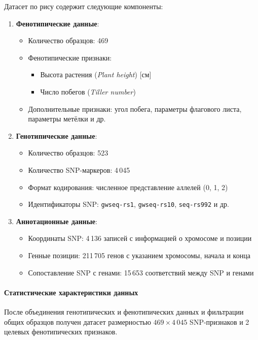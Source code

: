 Датасет по рису содержит следующие компоненты:

\begin{enumerate}
	\item \textbf{Фенотипические данные}: 
	\begin{itemize}
		\item Количество образцов: 469
		\item Фенотипические признаки:
		\begin{itemize}
			\item Высота растения (\textit{Plant height}) [см]
			\item Число побегов (\textit{Tiller number})
		\end{itemize}
		\item Дополнительные признаки: угол побега, параметры флагового листа, параметры метёлки и др.
	\end{itemize}
	
	\item \textbf{Генотипические данные}:
	\begin{itemize}
		\item Количество образцов: 523
		\item Количество SNP-маркеров: 4\,045
		\item Формат кодирования: численное представление аллелей (0, 1, 2)
		\item Идентификаторы SNP: \texttt{gwseq-rs1}, \texttt{gwseq-rs10}, \texttt{seq-rs992} и др.
	\end{itemize}
	
	\item \textbf{Аннотационные данные}:
	\begin{itemize}
		\item Координаты SNP: 4\,136 записей с информацией о хромосоме и позиции
		\item Генные позиции: 211\,705 генов с указанием хромосомы, начала и конца
		\item Сопоставление SNP с генами: 15\,653 соответствий между SNP и генами
	\end{itemize}
\end{enumerate}

\paragraph{Статистические характеристики данных}

После объединения генотипических и фенотипических данных и фильтрации общих образцов получен датасет размерностью $469 \times 4\,045$ SNP-признаков и 2 целевых фенотипических признаков.

